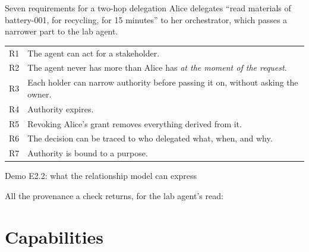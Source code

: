 \documentclass[aspectratio=169, 10pt]{beamer}
\begin{document}
\begin{frame}{Seven requirements for a two-hop delegation}
  \small
  Alice delegates ``read materials of battery-001, for recycling, for 15 minutes'' to her orchestrator, which passes a narrower part to the lab agent.
  \vspace{2mm}
  \begin{tabularx}{\textwidth}{@{}l X@{}}
    \toprule
    R1 & The agent can act for a stakeholder. \\
    R2 & The agent never has more than Alice has \emph{at the moment of the request}. \\
    R3 & Each holder can narrow authority before passing it on, without asking the owner. \\
    R4 & Authority expires. \\
    R5 & Revoking Alice's grant removes everything derived from it. \\
    R6 & The decision can be traced to who delegated what, when, and why. \\
    R7 & Authority is bound to a purpose. \\
    \bottomrule
  \end{tabularx}
\end{frame}

\begin{frame}{Demo E2.2: what the relationship model can express}
  \centering{}\par
  \vspace{2mm}
  \small All the provenance a check returns, for the lab agent's read:
\end{frame}

\section{Capabilities}
\end{document}
